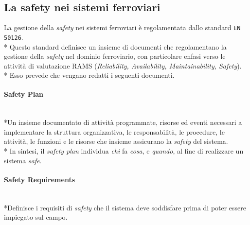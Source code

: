 \subsection{La safety nei sistemi ferroviari}
La gestione della \emph{safety} nei sistemi ferroviari \`e regolamentata dallo standard \texttt{EN 50126}. \cite{50126}\\*
Questo standard definisce un insieme di documenti che regolamentano la gestione della \emph{safety} nel dominio ferroviario, con particolare enfasi verso le attivit\`a di valutazione RAMS (\emph{Reliability, Availability, Maintainability, Safety}).\\*
Esso prevede che vengano redatti i seguenti documenti.
\paragraph{Safety Plan}\mbox{}\\*Un insieme documentato di attivit\`a programmate, risorse ed eventi necessari a implementare la struttura organizzativa, le responsabilit\`a, le procedure, le attivit\`a, le funzioni e le risorse che insieme assicurano la \emph{safety} del sistema.\\*
In sintesi, il \emph{safety plan} individua \emph{chi} fa \emph{cosa}, e \emph{quando}, al fine di realizzare un sistema \emph{safe}.
\paragraph{Safety Requirements}\mbox{}\\*Definisce i requisiti di \emph{safety} che il sistema deve soddisfare prima di poter essere impiegato sul campo.

